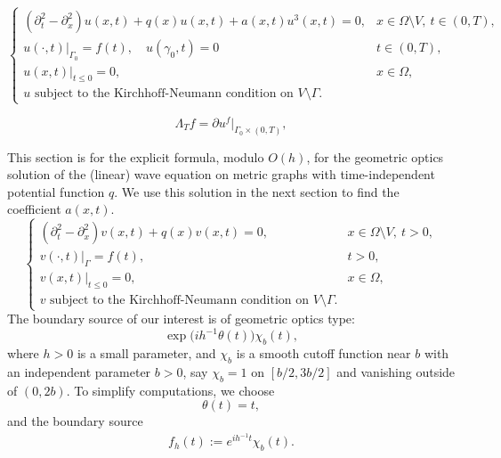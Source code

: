 \documentclass[10pt,a4paper]{amsart}
\begin{document}
\begin{equation}\label{eq-wave-nonlinear}
    \begin{cases}
    (\partial_{t}^2 -\partial_x^2 ) u(x,t)+q(x) u(x,t)+a(x,t)u^3(x,t)=0, &x\in \Omega\setminus V, \ t \in (0,T),\\
    u(\cdot,t)|_{\Gamma_0}=f(t),\quad u(\gamma_0,t)=0 & t \in (0,T),\\
    u(x,t)|_{t \leq 0}=0, &  x\in \Omega, \\
          u \textrm{ subject to the Kirchhoff-Neumann condition on } V\setminus\Gamma.
    \end{cases}
\end{equation}

\begin{equation}\label{DN-nonlinear}
\Lambda_T f = \partial u^f|_{\Gamma_0 \times (0,T)},
\end{equation}

This section is for the explicit formula, modulo $O(h)$, for the geometric optics solution of the (linear) wave equation on metric graphs with time-independent potential function $q$. We use this solution in the next section to find the coefficient $a(x,t).$
\begin{equation}\label{eq-gauss}
    \begin{cases}
    (\partial_{t}^2 -\partial_x^2 ) v(x,t)+q(x) v(x,t)=0, &x\in \Omega \setminus V, \  t > 0,\\    v(\cdot,t)|_{\Gamma}=f(t), & t> 0,\\
          v(x,t)|_{t\leq 0}=0, &x\in \Omega,\\
    v \textrm{ subject to the Kirchhoff-Neumann condition on } V\setminus\Gamma.
    \end{cases}
\end{equation}
The boundary source of our interest is of geometric optics type:
\begin{equation*}
\exp \big(i h^{-1} \theta(t) \big) \chi_b(t),
\end{equation*}
where $h>0$ is a small parameter, and $\chi_b$ is a smooth cutoff function near $b$ with an independent parameter $b>0$, say $\chi_b=1$ on $[b/2,3b/2]$ and vanishing outside of $(0,2b)$.
To simplify computations, we choose 
\begin{equation} \label{theta}
\theta(t)=t,
\end{equation}
and the boundary source
\begin{eqnarray} \label{source}
f_h(t) := e^{ih^{-1}t} \chi_b(t).
\end{eqnarray}
\end{document}
